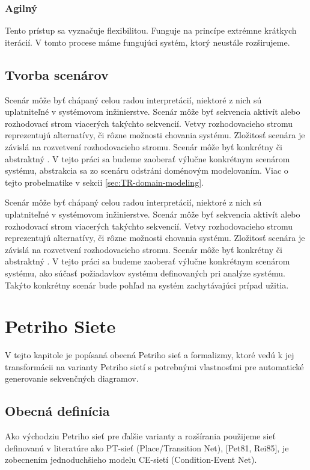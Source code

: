 \subsection{Agilný}
Tento prístup sa vyznačuje flexibilitou. Funguje na princípe extrémne krátkych iterácií. V tomto procese máme fungujúci systém, ktorý neustále rozširujeme. 

\section{Tvorba scenárov} 

Scenár môže byť chápaný celou radou interpretácií, niektoré z nich sú uplatniteľné v systémovom inžinierstve. Scenár môže byť sekvencia aktivít alebo rozhodovací strom viacerých takýchto sekvencií. Vetvy rozhodovacieho stromu reprezentujú alternatívy, či rôzne možnosti chovania systému. Zložitosť scenára je závislá na rozvetvení rozhodovacieho stromu. Scenár môže byť konkrétny či abstraktný \cite{scenarios}. V tejto práci sa budeme zaoberať výlučne konkrétnym scenárom systému, abstrakcia sa zo scenáru odstráni doménovým modelovaním. Viac o tejto probelmatike v sekcii \ref{sec:TR-domain-modeling}.

Scenár môže byť chápaný celou radou interpretácií, niektoré z nich sú uplatniteľné v systémovom inžinierstve. Scenár môže byť sekvencia aktivít alebo rozhodovací strom viacerých takýchto sekvencií. Vetvy rozhodovacieho stromu reprezentujú alternatívy, či rôzne možnosti chovania systému. Zložitosť scenára je závislá na rozvetvení rozhodovacieho stromu. Scenár môže byť konkrétny či abstraktný \cite{scenarios}. V tejto práci sa budeme zaoberať výlučne konkrétnym scenárom systému, ako súčasť požiadavkov systému definovaných pri analýze systému. Takýto konkrétny scenár bude pohľad na systém zachytávajúci prípad užitia.


\chapter{Petriho Siete}
V tejto kapitole je popísaná obecná Petriho sieť a formalizmy, ktoré vedú k jej transformácii na varianty Petriho sietí s potrebnými vlastnosťmi pre automatické generovanie sekvenčných diagramov.

\section{Obecná definícia}
Ako východziu Petriho sieť pre ďalšie varianty a rozšírania použijeme sieť definovanú v literatúre ako PT-sieť (Place/Transition Net), [Pet81, Rei85], je zobecnením jednoduchšieho modelu CE-sietí (Condition-Event Net).

